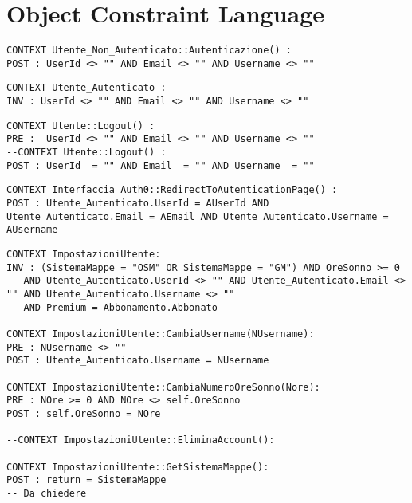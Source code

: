 \section{Object Constraint Language}
\label{secD3:ObjectConstraintLanguage}

\begin{listaPersonale}[OCL]{}
    \begin{lstlisting}
CONTEXT Utente_Non_Autenticato::Autenticazione() : 
POST : UserId <> "" AND Email <> "" AND Username <> ""
    \end{lstlisting}
    \begin{lstlisting}
CONTEXT Utente_Autenticato : 
INV : UserId <> "" AND Email <> "" AND Username <> ""
    \end{lstlisting}
    \begin{lstlisting}
CONTEXT Utente::Logout() : 
PRE :  UserId <> "" AND Email <> "" AND Username <> ""
--CONTEXT Utente::Logout() : 
POST : UserId  = "" AND Email  = "" AND Username  = ""
    \end{lstlisting}



    \begin{lstlisting}
CONTEXT Interfaccia_Auth0::RedirectToAutenticationPage() :
POST : Utente_Autenticato.UserId = AUserId AND Utente_Autenticato.Email = AEmail AND Utente_Autenticato.Username = AUsername
    \end{lstlisting}




    \begin{lstlisting}
CONTEXT ImpostazioniUtente:
INV : (SistemaMappe = "OSM" OR SistemaMappe = "GM") AND OreSonno >= 0 
-- AND Utente_Autenticato.UserId <> "" AND Utente_Autenticato.Email <> "" AND Utente_Autenticato.Username <> ""
-- AND Premium = Abbonamento.Abbonato

CONTEXT ImpostazioniUtente::CambiaUsername(NUsername):
PRE : NUsername <> ""
POST : Utente_Autenticato.Username = NUsername

CONTEXT ImpostazioniUtente::CambiaNumeroOreSonno(Nore):
PRE : NOre >= 0 AND NOre <> self.OreSonno
POST : self.OreSonno = NOre

--CONTEXT ImpostazioniUtente::EliminaAccount():

CONTEXT ImpostazioniUtente::GetSistemaMappe():
POST : return = SistemaMappe 
-- Da chiedere


\end{lstlisting}
\end{listaPersonale}
